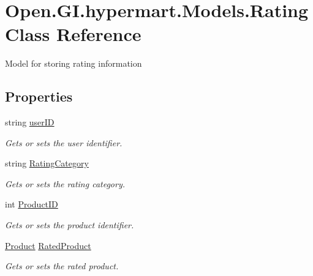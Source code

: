 \hypertarget{class_open_1_1_g_i_1_1hypermart_1_1_models_1_1_rating}{}\section{Open.\+G\+I.\+hypermart.\+Models.\+Rating Class Reference}
\label{class_open_1_1_g_i_1_1hypermart_1_1_models_1_1_rating}


Model for storing rating information  


\subsection*{Properties}
\begin{DoxyCompactItemize}
\item 
string \hyperlink{class_open_1_1_g_i_1_1hypermart_1_1_models_1_1_rating_a1e8a569cc68356a222db0eee305273f2}{user\+ID}
\begin{DoxyCompactList}\small\item\em Gets or sets the user identifier. \end{DoxyCompactList}\item 
string \hyperlink{class_open_1_1_g_i_1_1hypermart_1_1_models_1_1_rating_a89b742b6bfd7d9aa0929b73c951fb37e}{Rating\+Category}
\begin{DoxyCompactList}\small\item\em Gets or sets the rating category. \end{DoxyCompactList}\item 
int \hyperlink{class_open_1_1_g_i_1_1hypermart_1_1_models_1_1_rating_a84ebcfe9c03b3ee3859323be1a9b02da}{Product\+ID}
\begin{DoxyCompactList}\small\item\em Gets or sets the product identifier. \end{DoxyCompactList}\item 
\hyperlink{class_open_1_1_g_i_1_1hypermart_1_1_models_1_1_product}{Product} \hyperlink{class_open_1_1_g_i_1_1hypermart_1_1_models_1_1_rating_acf0485f546d4d61e33703627040247e8}{Rated\+Product}
\begin{DoxyCompactList}\small\item\em Gets or sets the rated product. \end{DoxyCompactList}\item 

\end{DoxyCompactItemize}
